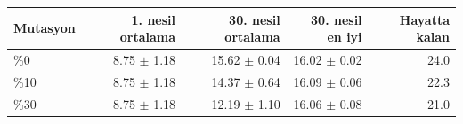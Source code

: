 \begin{tabular}{lrrrr}
\hline
Mutasyon & 1. nesil ortalama & 30. nesil ortalama & 30. nesil en iyi & Hayatta kalan \\
\hline
\%0 & 8.75 $\pm$ 1.18 & 15.62 $\pm$ 0.04 & 16.02 $\pm$ 0.02 & 24.0 \\
\%10 & 8.75 $\pm$ 1.18 & 14.37 $\pm$ 0.64 & 16.09 $\pm$ 0.06 & 22.3 \\
\%30 & 8.75 $\pm$ 1.18 & 12.19 $\pm$ 1.10 & 16.06 $\pm$ 0.08 & 21.0 \\
\hline
\end{tabular}
